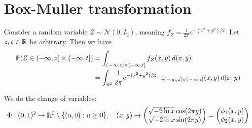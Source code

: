 \section{Box-Muller transformation}
\newcommand{\J}{\operatorname{J}}
\newcommand{\atantwo}{\operatorname{atan2}}
Consider a random variable $Z \sim \mathcal{N}(0, I_2)$, meaning $f_Z = \frac{1}{2\pi}e^{-(x^2 + y^2)/2}$. Let $z, t \in \mathbb{R}$ be arbitrary. Then we have
\begin{align}
    \operatorname{\mathbb{P}}(Z \in (-\infty,z] \times (-\infty,t])
     & = \int_{(-\infty,z] \times (-\infty,t]} f_Z(x,y) \, d(x, y) \notag
    \\ &= \int_{\mathbb{R}^2} \frac{1}{2\pi} e^{-(x^2 + y^2)/2} \cdot \operatorname{\mathbb{I}}_{(-\infty,z] \times (-\infty,t]}(x, y) \, d(x, y) \label{eq:cdf box muller}
\end{align}

We do the change of variables:
\[\Phi:(0, 1)^2 \to \mathbb{R}^2 \setminus \{(u, 0): u \geq 0\}, \quad (x, y) \mapsto
    \begin{pmatrix}
        \sqrt{-2 \ln x} \cos (2\pi y) \\
        \sqrt{-2 \ln x} \sin (2\pi y)
    \end{pmatrix}
    = \begin{pmatrix}
        \phi_1(x, y) \\
        \phi_2(x, y)
    \end{pmatrix}\]

